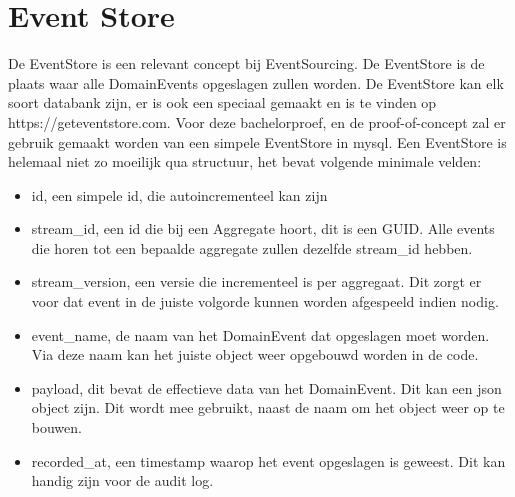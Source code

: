 
\section{Event Store}
\label{sec:event-store}

De EventStore is een relevant concept bij EventSourcing. De EventStore is de plaats waar alle DomainEvents opgeslagen zullen worden. De EventStore kan elk soort databank zijn, er is ook een speciaal gemaakt en is te vinden op https://geteventstore.com. Voor deze bachelorproef, en de proof-of-concept zal er gebruik gemaakt worden van een simpele EventStore in mysql. Een EventStore is helemaal niet zo moeilijk qua structuur, het bevat volgende minimale velden:

\begin{itemize}
  \item{id, een simpele id, die autoincrementeel kan zijn}
  \item{stream_id, een id die bij een Aggregate hoort, dit is een GUID. Alle events die horen tot een bepaalde aggregate zullen dezelfde stream_id hebben.}
  \item{stream_version, een versie die incrementeel is per aggregaat. Dit zorgt er voor dat event in de juiste volgorde kunnen worden afgespeeld indien nodig.}
  \item{event_name, de naam van het DomainEvent dat opgeslagen moet worden. Via deze naam kan het juiste object weer opgebouwd worden in de code.}
  \item{payload, dit bevat de effectieve data van het DomainEvent. Dit kan een json object zijn. Dit wordt mee gebruikt, naast de naam om het object weer op te bouwen.}
  \item{recorded_at, een timestamp waarop het event opgeslagen is geweest. Dit kan handig zijn voor de audit log.}
\end{itemize}
